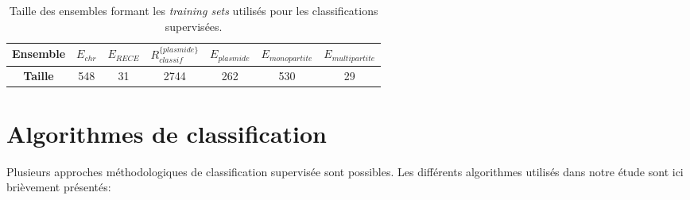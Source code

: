 \begin{table}[H]
	\begin{center}
\caption[Taille des ensembles formant les \textit{training sets}]{Taille des ensembles formant les \textit{training sets} utilisés pour les classifications supervisées.}\label{tablearningsize}
	\begin{tabular}{c||c|c|c|c|c|c}
	\textbf{Ensemble}&$E_{chr}$&$E_{RECE}$&$R^{\{plasmide\}}_{classif}$&$E_{plasmide}$&$E_{monopartite}$&$E_{multipartite}$\\
	\hline
	\textbf{Taille}& 548&31&2744&262&530&29\\
	\end{tabular}
\end{center}
\end{table}



\section{Algorithmes de classification}
	Plusieurs approches méthodologiques de classification supervisée sont possibles. Les différents algorithmes utilisés dans notre étude sont ici brièvement présentés:

